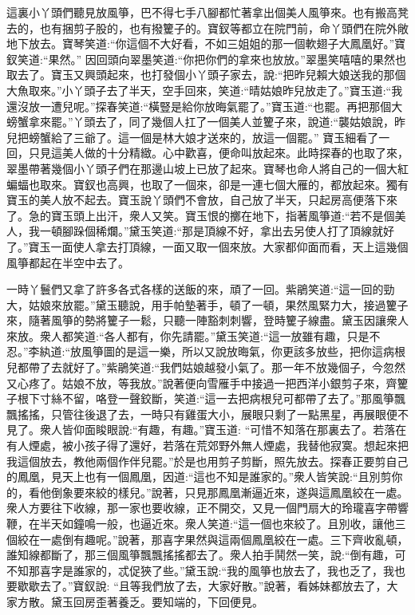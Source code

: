 \begin{parag}
    這裏小丫頭們聽見放風箏，巴不得七手八腳都忙著拿出個美人風箏來。也有搬高凳去的，也有捆剪子股的，也有撥籰子的。寶釵等都立在院門前，命丫頭們在院外敞地下放去。寶琴笑道:“你這個不大好看，不如三姐姐的那一個軟翅子大鳳凰好。”寶釵笑道:“果然。” 因回頭向翠墨笑道:“你把你們的拿來也放放。”翠墨笑嘻嘻的果然也取去了。寶玉又興頭起來，也打發個小丫頭子家去，說:“把昨兒賴大娘送我的那個大魚取來。”小丫頭子去了半天，空手回來，笑道:“晴姑娘昨兒放走了。”寶玉道:“我還沒放一遭兒呢。”探春笑道:“橫豎是給你放晦氣罷了。”寶玉道:“也罷。再把那個大螃蟹拿來罷。”丫頭去了，同了幾個人扛了一個美人並籰子來，說道:“襲姑娘說，昨兒把螃蟹給了三爺了。這一個是林大娘才送來的，放這一個罷。” 寶玉細看了一回，只見這美人做的十分精緻。心中歡喜，便命叫放起來。此時探春的也取了來，翠墨帶著幾個小丫頭子們在那邊山坡上已放了起來。寶琴也命人將自己的一個大紅蝙蝠也取來。寶釵也高興，也取了一個來，卻是一連七個大雁的，都放起來。獨有寶玉的美人放不起去。寶玉說丫頭們不會放，自己放了半天，只起房高便落下來了。急的寶玉頭上出汗，衆人又笑。寶玉恨的擲在地下，指著風箏道:“若不是個美人，我一頓腳跺個稀爛。”黛玉笑道:“那是頂線不好，拿出去另使人打了頂線就好了。”寶玉一面使人拿去打頂線，一面又取一個來放。大家都仰面而看，天上這幾個風箏都起在半空中去了。
\end{parag}


\begin{parag}
    一時丫鬟們又拿了許多各式各樣的送飯的來，頑了一回。紫鵑笑道:“這一回的勁大，姑娘來放罷。”黛玉聽說，用手帕墊著手，頓了一頓，果然風緊力大，接過籰子來，隨著風箏的勢將籰子一鬆，只聽一陣豁刺刺響，登時籰子線盡。黛玉因讓衆人來放。衆人都笑道:“各人都有，你先請罷。”黛玉笑道:“這一放雖有趣，只是不忍。”李紈道:“放風箏圖的是這一樂，所以又說放晦氣，你更該多放些，把你這病根兒都帶了去就好了。”紫鵑笑道:“我們姑娘越發小氣了。那一年不放幾個子，今忽然又心疼了。姑娘不放，等我放。”說著便向雪雁手中接過一把西洋小銀剪子來，齊籰子根下寸絲不留，咯登一聲鉸斷，笑道:“這一去把病根兒可都帶了去了。”那風箏飄飄搖搖，只管往後退了去，一時只有雞蛋大小，展眼只剩了一點黑星，再展眼便不見了。衆人皆仰面睃眼說:“有趣，有趣。”寶玉道: “可惜不知落在那裏去了。若落在有人煙處，被小孩子得了還好，若落在荒郊野外無人煙處，我替他寂寞。想起來把我這個放去，教他兩個作伴兒罷。”於是也用剪子剪斷，照先放去。探春正要剪自己的鳳凰，見天上也有一個鳳凰，因道:“這也不知是誰家的。”衆人皆笑說:“且別剪你的，看他倒象要來絞的樣兒。”說著，只見那鳳凰漸逼近來，遂與這鳳凰絞在一處。衆人方要往下收線，那一家也要收線，正不開交，又見一個門扇大的玲瓏喜字帶響鞭，在半天如鐘鳴一般，也逼近來。衆人笑道:“這一個也來絞了。且別收，讓他三個絞在一處倒有趣呢。”說著，那喜字果然與這兩個鳳凰絞在一處。三下齊收亂頓，誰知線都斷了，那三個風箏飄飄搖搖都去了。衆人拍手鬨然一笑，說:“倒有趣，可不知那喜字是誰家的，忒促狹了些。”黛玉說:“我的風箏也放去了，我也乏了，我也要歇歇去了。”寶釵說: “且等我們放了去，大家好散。”說著，看姊妹都放去了，大家方散。黛玉回房歪著養乏。要知端的，下回便見。
\end{parag}


